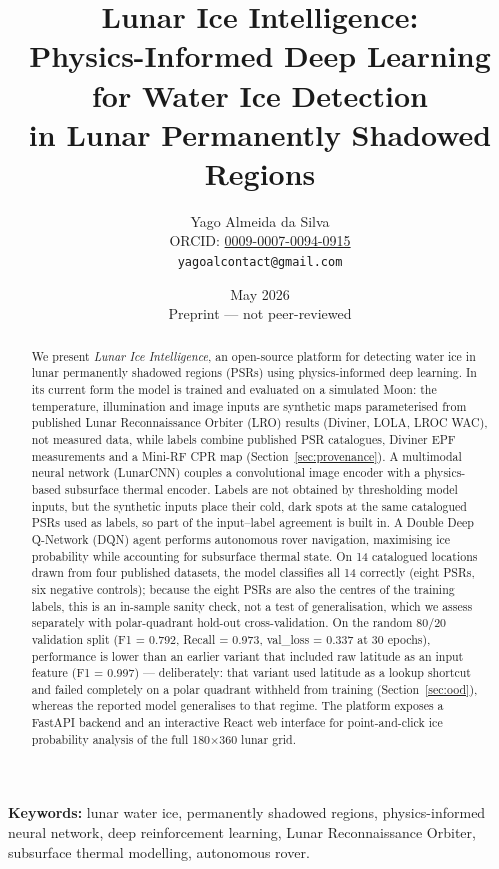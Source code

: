 \documentclass[12pt,a4paper]{article}
\title{%
  \textbf{Lunar Ice Intelligence:}\\
  Physics-Informed Deep Learning for Water Ice Detection\\
  in Lunar Permanently Shadowed Regions
}
\author{
  Yago Almeida da Silva\\
  \small ORCID: \href{https://orcid.org/0009-0007-0094-0915}{0009-0007-0094-0915}\\
  \small \texttt{yagoalcontact@gmail.com}
}
\date{May 2026 \\ \small Preprint — not peer-reviewed}
\begin{document}
\maketitle

\begin{abstract}
We present \textit{Lunar Ice Intelligence}, an open-source platform for detecting
water ice in lunar permanently shadowed regions (PSRs) using physics-informed deep
learning. In its current form the model is trained and evaluated on a simulated
Moon: the temperature, illumination and image inputs are synthetic maps
parameterised from published Lunar Reconnaissance Orbiter (LRO) results (Diviner,
LOLA, LROC WAC), not measured data, while labels combine published PSR catalogues,
Diviner EPF measurements and a Mini-RF CPR map (Section~\ref{sec:provenance}). A
multimodal neural network (LunarCNN) couples a convolutional image encoder with a
physics-based subsurface thermal encoder. Labels are not obtained by thresholding
model inputs, but the synthetic inputs place their cold, dark spots at the same
catalogued PSRs used as labels, so part of the input--label agreement is built in.
A Double Deep Q-Network (DQN) agent performs autonomous rover navigation, maximising
ice probability while accounting for subsurface thermal state. On 14 catalogued locations
drawn from four published datasets, the model classifies all 14 correctly (eight
PSRs, six negative controls); because the eight PSRs are also the centres of the
training labels, this is an in-sample sanity check, not a test of generalisation,
which we assess separately with polar-quadrant hold-out cross-validation. On the random 80/20 validation split
(F1 = 0.792, Recall = 0.973, val\_loss = 0.337 at 30 epochs), performance is
lower than an earlier variant that included raw latitude as an input feature
(F1 = 0.997) — deliberately: that variant used latitude as a lookup shortcut
and failed completely on a polar quadrant withheld from training
(Section~\ref{sec:ood}), whereas the reported model generalises to that
regime. The platform
exposes a FastAPI backend and an interactive React web interface for point-and-click
ice probability analysis of the full 180$\times$360 lunar grid.
\end{abstract}

\vspace{0.5em}
\noindent\textbf{Keywords:} lunar water ice, permanently shadowed regions,
physics-informed neural network, deep reinforcement learning,
Lunar Reconnaissance Orbiter, subsurface thermal modelling, autonomous rover.
\end{document}
